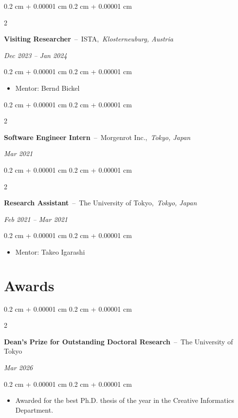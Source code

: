 \documentclass[10pt, letterpaper]{article}
\newenvironment{highlights}{
    \begin{itemize}[
        topsep=0.10 cm,
        parsep=0.10 cm,
        partopsep=0pt,
        itemsep=0pt,
        leftmargin=0.4 cm + 10pt
    ]
}{
    \end{itemize}
} %
\newenvironment{onecolentry}{
    \begin{adjustwidth}{
        0.2 cm + 0.00001 cm
    }{
        0.2 cm + 0.00001 cm
    }
}{
    \end{adjustwidth}
} %
\newenvironment{twocolentry}[2][]{
    \onecolentry
    \def\secondColumn{#2}
    \setcolumnwidth{\fill, 4.5 cm}
    \begin{paracol}{2}
}{
    \switchcolumn \raggedleft \secondColumn
    \end{paracol}
    \endonecolentry
} %
\begin{document}
        \vspace{0.2 cm}
        \begin{twocolentry}{
        \textit{Dec 2023 -- Jan 2024}}
            \textbf{Visiting Researcher}
            \,--\,
            ISTA,\,
            \textit{Klosterneuburg, Austria}
        \end{twocolentry}
        \vspace{0.10 cm}
        \begin{onecolentry}
            \begin{highlights}
                \item Mentor: Bernd Bickel
            \end{highlights}
        \end{onecolentry}

        \vspace{0.2 cm}
        \begin{twocolentry}{
        \textit{Mar 2021}}
            \textbf{Software Engineer Intern}
            \,--\,
            Morgenrot Inc.,\,
            \textit{Tokyo, Japan}
        \end{twocolentry}

        \vspace{0.2 cm}
        \begin{twocolentry}{
        \textit{Feb 2021 -- Mar 2021}}
            \textbf{Research Assistant}
            \,--\,
            The University of Tokyo,\,
            \textit{Tokyo, Japan}
        \end{twocolentry}
        \vspace{0.10 cm}
        \begin{onecolentry}
            \begin{highlights}
                \item Mentor: Takeo Igarashi
            \end{highlights}
        \end{onecolentry}

    \section{Awards}
        \begin{twocolentry}{
        \textit{Mar 2026}}
            \textbf{Dean's Prize for Outstanding Doctoral Research}
            \,--\,
            The University of Tokyo
        \end{twocolentry}
        \vspace{0.10 cm}
        \begin{onecolentry}
            \begin{highlights}
                \item Awarded for the best Ph.D. thesis of the year in the Creative Informatics Department.
            \end{highlights}
        \end{onecolentry}
\end{document}

